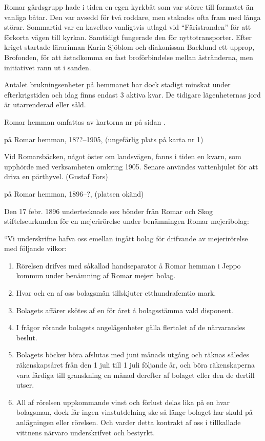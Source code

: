
Romar gårdsgrupp hade i tiden en egen kyrkbåt som var större till formatet än vanliga båtar. Den var avsedd för två roddare, men stakades ofta fram med långa störar. Sommartid var en kavelbro vanligtvis utlagd vid ``Färistranden'' för att förkorta vägen till kyrkan. Samtidigt fungerade den för nyttotransporter. Efter kriget startade lärarinnan Karin Sjöblom och diakonissan Backlund ett upprop, Brofonden, för att åstadkomma en fast broförbindelse mellan åstränderna, men initiativet rann ut i sanden.

Antalet brukningsenheter på hemmanet har dock stadigt minskat under efterkrigstiden och idag finns endast 3 aktiva kvar. De tidigare lägenheternas jord är utarrenderad eller såld.



Romar hemman omfattas av kartorna nr  på sidan \pageref{map:2}.




%
 på Romar hemman, 18??--1905, (ungefärlig plats på karta nr 1)

Vid Romarsbäcken, något öster om landsvägen, fanns i tiden en kvarn, som upphörde med verksamheten omkring 1905. Senare användes vattenhjulet för att driva en pärthyvel. (Gustaf Fors)


%
 på Romar hemman, 1896--?, (platsen okänd)

Den 17 febr. 1896 undertecknade sex bönder från Romar och Skog stiftelseurkunden för en mejerirörelse under benämningen Romar mejeribolag:

``Vi underskrifne hafva oss emellan ingått bolag för drifvande av mejerirörelse med följande vilkor:
\begin{enumerate}
  \item Rörelsen drifves med såkallad handseparator å Romar hemman i Jeppo kommun under benämning af Romar mejeri bolag.
  \item Hvar och en af oss bolagsmän tillskjuter etthundrafemtio mark.
  \item Bolagets affärer skötes af en för året å bolagsstämma vald disponent.
  \item I frågor rörande bolagets angelägenheter gälla flertalet af de närvarandes beslut.
  \item Bolagets böcker böra afslutas med juni månads utgång och räknas således räkenskapsåret från den 1 juli till 1 juli följande år, och böra räkenskaperna vara färdiga till granskning en månad derefter af bolaget eller den de dertill utser.
  \item All af rörelsen uppkommande vinst och förlust delas lika på en hvar bolagsman, dock får ingen vinstutdelning ske så länge bolaget har skuld på anlägningen eller rörelsen. Och varder detta kontrakt af oss i tillkallade vittnens närvaro underskrifvet och bestyrkt.
\end{enumerate}

